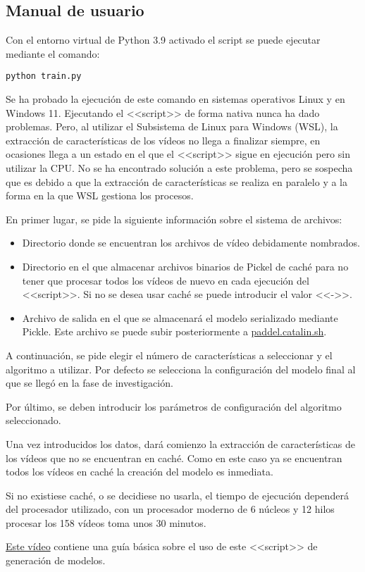 \subsection{Manual de usuario}

Con el entorno virtual de Python 3.9 activado el script se puede ejecutar
mediante el comando:

\texttt{python train.py}

Se ha probado la ejecución de este comando en sistemas operativos Linux y en
Windows 11. Ejecutando el <<script>> de forma nativa nunca ha dado problemas.
Pero, al utilizar el Subsistema de Linux para Windows (WSL), la extracción de
características de los vídeos no llega a finalizar siempre, en ocasiones llega a
un estado en el que el <<script>> sigue en ejecución pero sin utilizar la CPU.
No se ha encontrado solución a este problema, pero se sospecha que es debido a
que la extracción de características se realiza en paralelo y a la forma en la
que WSL gestiona los procesos.

En primer lugar, se pide la siguiente información sobre el sistema de archivos:

\begin{itemize}
    \item Directorio donde se encuentran los archivos de vídeo debidamente
    nombrados.
    \item Directorio en el que almacenar archivos binarios de Pickel de caché
    para no tener que procesar todos los vídeos de nuevo en cada ejecución del
    <<script>>. Si no se desea usar caché se puede introducir el valor <<->>.
    \item Archivo de salida en el que se almacenará el modelo serializado
    mediante Pickle. Este archivo se puede subir posteriormente a
    \href{https://paddel.catalin.sh}{paddel.catalin.sh}.
\end{itemize}


A continuación, se pide elegir el número de características a seleccionar y el
algoritmo a utilizar. Por defecto se selecciona la configuración del modelo
final al que se llegó en la fase de investigación.


Por último, se deben introducir los parámetros de configuración del algoritmo
seleccionado.


Una vez introducidos los datos, dará comienzo la extracción de características
de los vídeos que no se encuentran en caché. Como en este caso ya se encuentran
todos los vídeos en caché la creación del modelo es inmediata.

Si no existiese caché, o se decidiese no usarla, el tiempo de ejecución
dependerá del procesador utilizado, con un procesador moderno de 6 núcleos y 12
hilos procesar los 158 vídeos toma unos 30 minutos.

\href{https://youtu.be/ttNIr2RnzP0}{Este vídeo} contiene una guía básica sobre
el uso de este <<script>> de generación de modelos.
